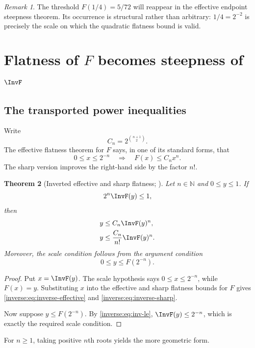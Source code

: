 \documentclass[11pt,oneside]{article}
\newtheorem{theorem}{Theorem}[section]
\theoremstyle{definition}
\theoremstyle{remark}
\newtheorem{remark}[theorem]{Remark}
\newcommand{\N}{\mathbb N}
\begin{document}
\begin{remark}
The threshold $F(1/4)=5/72$ will reappear in the effective endpoint
steepness theorem.  Its occurrence is structural rather than arbitrary:
$1/4=2^{-2}$ is precisely the scale on which the quadratic flatness bound
is valid.
\end{remark}

\section{\texorpdfstring{Flatness of \(F\) becomes steepness of \(\InvF\)}{Flatness of F becomes steepness of its inverse}}
\label{inverse:sec:inverse-steepness}

\subsection{The transported power inequalities}

Write
\[
 C_n=2^{\binom{n+1}{2}}.
\]
The effective flatness theorem for $F$ says, in one of its standard forms,
that
\[
 0\leq x\leq2^{-n}
 \quad\Longrightarrow\quad
 F(x)\leq C_nx^n. \label{inverse:eq:flatness-input}
\]
The sharp version improves the right-hand side by the factor $n!$.

\begin{theorem}[Inverted effective and sharp flatness; \Formalized]
\label{inverse:thm:inverted-flatness}
Let $n\in\N$ and $0\leq y\leq1$.  If
\[
 2^n\InvF(y)\leq1,
\]
then
\begin{align}
 y&\leq C_n\InvF(y)^n, \label{inverse:eq:inverse-effective}\\
 y&\leq \frac{C_n}{n!}\InvF(y)^n. \label{inverse:eq:inverse-sharp}
\end{align}
Moreover, the scale condition follows from the argument condition
\[
 0\leq y\leq F(2^{-n}).
\]
\end{theorem}

\begin{proof}
Put $x=\InvF(y)$.  The scale hypothesis says $0\leq x\leq2^{-n}$, while
$F(x)=y$.  Substituting $x$ into the effective and sharp flatness bounds
for $F$ gives \eqref{inverse:eq:inverse-effective} and
\eqref{inverse:eq:inverse-sharp}.

Now suppose $y\leq F(2^{-n})$.  By
\eqref{inverse:eq:inv-le}, $\InvF(y)\leq2^{-n}$, which is exactly the required
scale condition.
\end{proof}

For $n\geq1$, taking positive $n$th roots yields the more geometric form.
\end{document}

